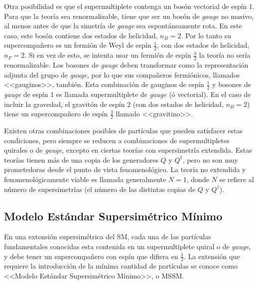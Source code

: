 Otra posibilidad es que el supermultiplete contenga un bosón vectorial de espín
1. Para que la teoría sea renormalizable, tiene que ser un bosón de \emph{gauge} no
masivo, al menos antes de que la simetría de \emph{gauge} sea espontáneamente rota. En
este caso, este bosón contiene dos estados de helicidad, $n_B=2$. Por lo tanto
su supercompa\~nero es un fermión de Weyl de espín $\frac{1}{2}$, con dos estados de
helicidad, $n_F=2$. Si en vez de esto, se intenta usar un fermión de espín $\frac{3}{2}$
la teoría no sería renormalizable. Los bosones de \emph{gauge} deben transformar como
la representación adjunta del grupo de \emph{gauge}, por lo que sus compañeros
fermiónicos, llamados <<gauginos>>, también. Esta combinación de gauginos
de espín $\frac{1}{2}$ y bosones de \emph{gauge} de espín 1 es llamada supermultiplete de
\emph{gauge} (ó vectorial).
En el caso de incluir la gravedad, el gravitón de espín 2 (con dos estados de helicidad,
$n_B=2$) tiene un supercompañero de espín $\frac{3}{2}$ llamado <<gravitino>>.

Existen otras combinaciones posibles de partículas que pueden satisfacer estas
condiciones, pero siempre se reducen a combinaciones de supermultipletes
quirales o de \emph{gauge}, excepto en ciertas teorías con supersimetría extendida.
Estas teorías tienen más de una copia de los generadores $Q$ y $Q^\dagger$, pero no
son muy prometedoras desde el punto de vista fenomenológico. La teoría no
extendida y fenomenológicamente viable es llamada generalmente $N=1$, donde $N$
se refiere al número de supersimetrías (el número de las distintas copias de
$Q$ y $Q^\dagger$).


\subsection{Modelo Estándar Supersimétrico Mínimo}

En una extensión supersimétrica del SM, cada una de las partículas fundamentales
conocidas esta contenida en un supermultiplete quiral o de \emph{gauge}, y debe tener
un supercompa\~nero con espín que difiera en $\frac{1}{2}$. La extensión que
requiere la introducción de la mínima cantidad de partículas se conoce como
<<Modelo Estándar Supersimétrico Mínimo>>, o MSSM.

